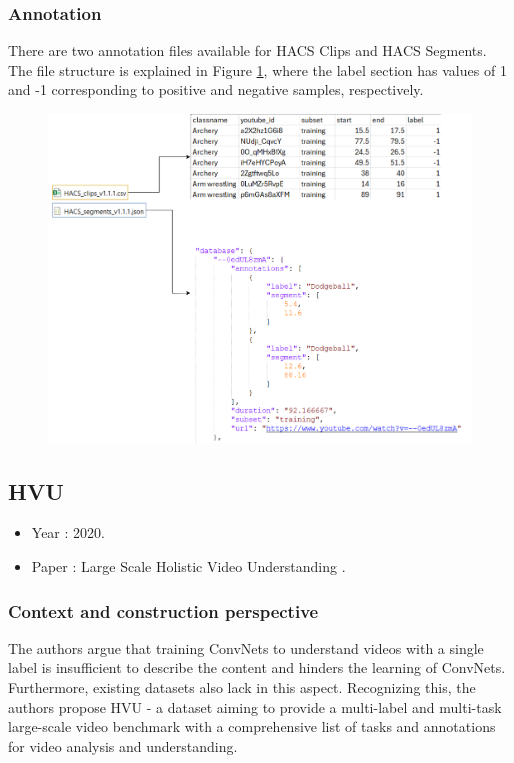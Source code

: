 \documentclass[10pt,onecolumn,letterpaper]{article}
\begin{document}
\subsubsection{Annotation}  

There are two annotation files available for HACS Clips and HACS Segments. The file structure is explained in Figure \ref{fig:untitled-diagram4}, where the label section has values of 1 and -1 corresponding to positive and negative samples, respectively.

\begin{figure}[h]
	\centering
	\includegraphics[width=0.7\linewidth]{"fig_info/fig4/Untitled Diagram.drawio"}
	\caption{}
	\label{fig:untitled-diagram4}
\end{figure}

\subsection{HVU}

\begin{itemize}
	\item Year : 2020.
	\item Paper : Large Scale Holistic Video Understanding \cite{HVU}.
\end{itemize}

\subsubsection{Context and construction perspective}

The authors argue that training ConvNets to understand videos with a single label is insufficient to describe the content and hinders the learning of ConvNets. Furthermore, existing datasets also lack in this aspect. Recognizing this, the authors propose HVU - a dataset aiming to provide a multi-label and multi-task large-scale video benchmark with a comprehensive list of tasks and annotations for video analysis and understanding.
\end{document}
